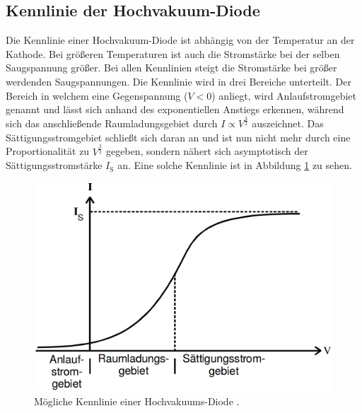 \subsection{Kennlinie der Hochvakuum-Diode}
Die Kennlinie einer Hochvakuum-Diode ist abhängig von der Temperatur an der Kathode. Bei größeren Temperaturen ist auch die Stromstärke bei der selben Saugspannung größer. Bei allen Kennlinien steigt die Stromstärke bei größer werdenden Saugspannungen. Die Kennlinie wird in drei Bereiche unterteilt. Der Bereich in welchem eine Gegenspannung ($V<0$) anliegt, wird Anlaufstromgebiet genannt und lässt sich anhand des exponentiellen Anstiegs erkennen, während sich das anschließende Raumladungsgebiet durch $I \propto V^\frac{3}{2}$ auszeichnet. Das Sättigungsstromgebiet schließt sich daran an und ist nun nicht mehr durch eine Proportionalität zu $V^\frac{3}{2}$ gegeben, sondern nähert sich asymptotisch der Sättigungsstromstärke $I_\text{S}$ an. Eine solche Kennlinie ist in Abbildung \ref{fig:Kennlinie} zu sehen.
\begin{figure}
	\centering
	\includegraphics[width=\linewidth-150pt,height=\textheight-150pt,keepaspectratio]{content/Bilder/Kennlinie.png}
	\caption{Mögliche Kennlinie einer Hochvakuums-Diode \cite{V504}.}
	\label{fig:Kennlinie}
\end{figure}

